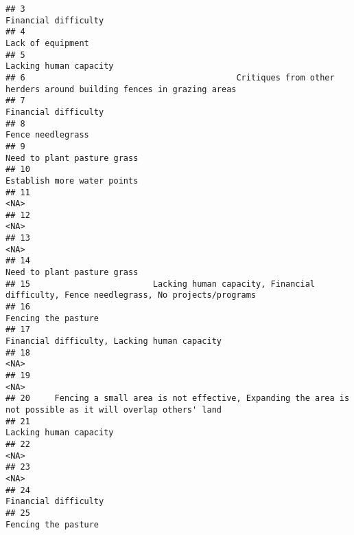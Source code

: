 \documentclass[
]{article}
\begin{document}
\begin{verbatim}
## 3                                                                                           Financial difficulty
## 4                                                                                              Lack of equipment
## 5                                                                                         Lacking human capacity
## 6                                           Critiques from other herders around building fences in grazing areas
## 7                                                                                           Financial difficulty
## 8                                                                                              Fence needlegrass
## 9                                                                                    Need to plant pasture grass
## 10                                                                                   Establish more water points
## 11                                                                                                          <NA>
## 12                                                                                                          <NA>
## 13                                                                                                          <NA>
## 14                                                                                   Need to plant pasture grass
## 15                         Lacking human capacity, Financial difficulty, Fence needlegrass, No projects/programs
## 16                                                                                           Fencing the pasture
## 17                                                                  Financial difficulty, Lacking human capacity
## 18                                                                                                          <NA>
## 19                                                                                                          <NA>
## 20     Fencing a small area is not effective, Expanding the area is not possible as it will overlap others' land
## 21                                                                                        Lacking human capacity
## 22                                                                                                          <NA>
## 23                                                                                                          <NA>
## 24                                                                                          Financial difficulty
## 25                                                                                           Fencing the pasture

\end{verbatim}
\end{document}
